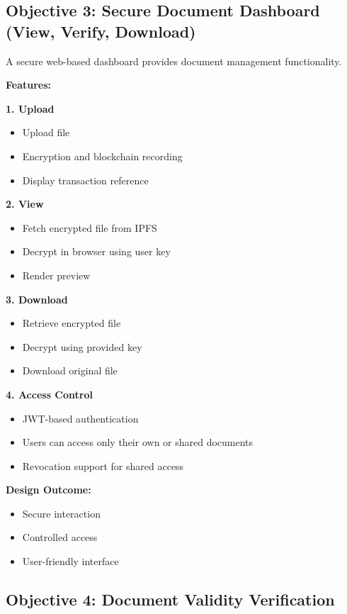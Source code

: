 \documentclass[12pt]{article}
\begin{document}
\subsection{Objective 3: Secure Document Dashboard (View, Verify, Download)}

A secure web-based dashboard provides document management functionality.

\textbf{Features:}

\textbf{1. Upload}
\begin{itemize}
\item Upload file
\item Encryption and blockchain recording
\item Display transaction reference
\end{itemize}

\textbf{2. View}
\begin{itemize}
\item Fetch encrypted file from IPFS
\item Decrypt in browser using user key
\item Render preview
\end{itemize}

\textbf{3. Download}
\begin{itemize}
\item Retrieve encrypted file
\item Decrypt using provided key
\item Download original file
\end{itemize}

\textbf{4. Access Control}
\begin{itemize}
\item JWT-based authentication
\item Users can access only their own or shared documents
\item Revocation support for shared access
\end{itemize}

\textbf{Design Outcome:}

\begin{itemize}
\item Secure interaction
\item Controlled access
\item User-friendly interface
\end{itemize}

\subsection{Objective 4: Document Validity Verification}
\end{document}
